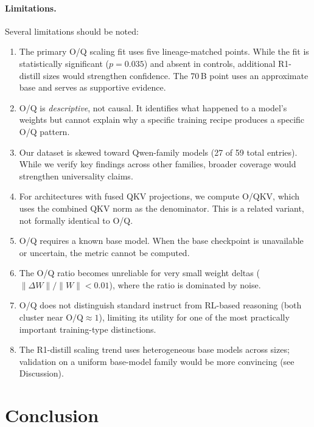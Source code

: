 \documentclass[11pt]{article}
\newcommand{\oq}{\text{O/Q}}
\newcommand{\dwnorm}{\|\Delta W\|/\|W\|}
\begin{document}
\paragraph{Limitations.}
Several limitations should be noted:
\begin{enumerate}[nosep]
  \item The primary O/Q scaling fit uses five lineage-matched points.
    While the fit is statistically significant ($p = 0.035$) and absent in
    controls, additional R1-distill sizes would strengthen confidence.
    The 70\,B point uses an approximate base and serves as supportive evidence.
  \item O/Q is \emph{descriptive}, not causal.
    It identifies what happened to a model's weights but cannot explain why a
    specific training recipe produces a specific O/Q pattern.
  \item Our dataset is skewed toward Qwen-family models (27 of 59 total entries).
    While we verify key findings across other families, broader coverage would
    strengthen universality claims.
  \item For architectures with fused QKV projections, we compute O/QKV, which
    uses the combined QKV norm as the denominator.
    This is a related variant, not formally identical to O/Q.
  \item O/Q requires a known base model.
    When the base checkpoint is unavailable or uncertain, the metric cannot be computed.
  \item The O/Q ratio becomes unreliable for very small weight deltas
    ($\dwnorm < 0.01$), where the ratio is dominated by noise.
  \item O/Q does not distinguish standard instruct from RL-based reasoning
    (both cluster near $\oq \approx 1$), limiting its utility for one of the
    most practically important training-type distinctions.
  \item The R1-distill scaling trend uses heterogeneous base models across
    sizes; validation on a uniform base-model family would be more convincing
    (see Discussion).
\end{enumerate}


\section{Conclusion}
\end{document}
